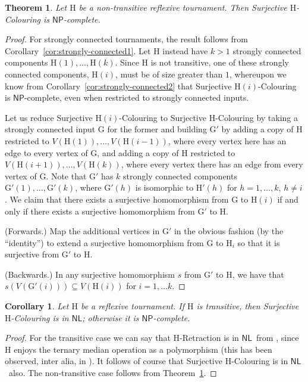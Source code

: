 \documentclass[a4paper,12pt]{article}
\newtheorem{theorem}{Theorem}
\newtheorem{corollary}{Corollary}
\theoremstyle{remark}
\newcommand{\NP}[0]{\ensuremath{\mathsf{NP}}}
\newcommand{\NL}[0]{\ensuremath{\mathsf{NL}}}
\newcommand{\G}{\ensuremath{\mathrm{G}}}
\renewcommand{\H}{\ensuremath{\mathrm{H}}}
\begin{document}
\begin{theorem}
Let $\H$ be a non-transitive reflexive tournament. Then {\sc Surjective $\H$-Colouring}
is \NP-complete.
\label{thm:hauptsatz}
\end{theorem}
\begin{proof}
For strongly connected tournaments, the result follows from Corollary~\ref{cor:strongly-connected1}. Let $\H$ instead have $k>1$ strongly connected components
$\H(1),\ldots,\H(k)$. 
Since $\H$ is not transitive, one of these strongly connected components, $\H(i)$, must be of size greater than $1$, whereupon we know from Corollary~\ref{cor:strongly-connected2} that
{\sc Surjective $\H(i)$-Colouring}
 is \NP-complete, even when restricted to strongly connected inputs. 
 
 Let us reduce
{\sc Surjective $\H(i)$-Colouring} to {\sc Surjective $\H$-Colouring} 
by taking a strongly connected input $\G$ for the former and building $\G'$ by adding a copy of $\H$ restricted to $V(\H(1)),\ldots,V(\H(i-1))$, where every vertex here has an edge to every vertex of $\G$, and adding a copy of  $\H$ restricted to $V(\H(i+1)),\ldots,V(\H(k))$, where every vertex there has an edge from every vertex of $\G$. 
Note that $\G'$ has $k$ strongly connected components $\G'(1),\ldots, \G'(k)$, where $\G'(h)$ is isomorphic to $\H'(h)$ for $h=1,\ldots,k$, $h\neq i$.
We claim 
that there exists a surjective homomorphism from $\G$ to $\H(i)$ if and only if there exists a surjective homomorphism from $\G'$ to 
$\H$.

(Forwards.) Map the additional vertices in $\G'$ in the obvious fashion (by the ``identity'') to extend a surjective homomorphism
from $\G$ to $\H_i$ so that it is surjective from $\G'$ to
$\H$.

(Backwards.) 
In any surjective homomorphism $s$ from $\G'$ to $\H$, we have that $s(V(\G'(i))) \subseteq V(\H(i))$ for $i=1,\ldots k$. 
\end{proof}

\begin{corollary}
Let $\H$ be a reflexive tournament. 
If $\H$ is transitive, then {\sc Surjective $\H$-Colouring}
 is in \NL; otherwise it is \NP-complete.
\label{cor:hauptsatz}
\end{corollary}
\begin{proof}
For the transitive case we can say that {\sc \H-Retraction} is in \NL\ from \cite{DalmauK08}, since $\H$ enjoys the ternary median operation as a polymorphism (this has been observed, inter alia, in \cite{larose2006taylor}). It follows of course that {\sc Surjective $\H$-Colouring} is in \NL\ also. The non-transitive case follows from Theorem~\ref{thm:hauptsatz}.
\end{proof}
\end{document}
